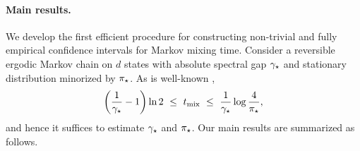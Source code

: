 \paragraph{Main results.}
We develop the first efficient 
procedure for constructing non-trivial
and fully empirical confidence intervals for Markov mixing time.
Consider a reversible ergodic Markov chain on $d$ states with absolute
spectral gap $\gamma_{\star}$ and stationary distribution minorized by $\pi_{\star}$. 
As is well-known \citep[Theorems~12.3 and~12.4]{LePeWi08},
\[
  \left(\frac1{\gamma_{\star}} - 1\right) \ln2
  \ \leq \ t_{\operatorname{mix}}
  \ \leq \ \frac1{\gamma_{\star}} \log \frac4{\pi_{\star}}
  ,
\]
and hence it suffices to estimate $\gamma_{\star}$ and $\pi_{\star}$. 
Our main results are summarized as follows.
